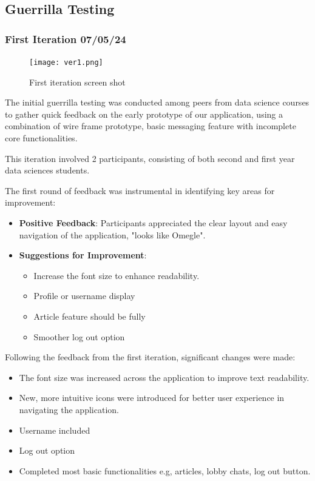 \documentclass[12pt,a4paper]{article}
\newcounter{subsubsubsection}[subsubsection]
\begin{document}
\subsection*{Guerrilla Testing}
\subsubsection*{First Iteration 07/05/24}

\begin{figure}[H]
\centering
\texttt{[image: ver1.png]} 
\caption{First iteration screen shot}
\label{fig:sitemap}
\end{figure}

The initial guerrilla testing was conducted among peers from data science courses to gather quick feedback on the early prototype of our application, using a combination of wire frame prototype, basic messaging feature with incomplete core functionalities. 

This iteration involved 2 participants, consisting of both second and first year data sciences students. 

The first round of feedback was instrumental in identifying key areas for improvement:
\begin{itemize}
    \item \textbf{Positive Feedback}: Participants appreciated the clear layout and easy navigation of the application, "looks like Omegle".
    \item \textbf{Suggestions for Improvement}:
    \begin{itemize}
        \item Increase the font size to enhance readability.
        \item Profile or username display
        \item Article feature should be fully 
        \item Smoother log out option
    \end{itemize}
\end{itemize}


Following the feedback from the first iteration, significant changes were made:
\begin{itemize}
    \item The font size was increased across the application to improve text readability.
    \item New, more intuitive icons were introduced for better user experience in navigating the application.
    \item Username included
    \item Log out option
    \item Completed most basic functionalities e.g, articles, lobby chats, log out button. 
\end{itemize}
\end{document}
